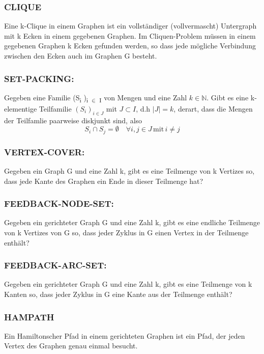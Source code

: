 \documentclass[11pt,twoside,landscape]{article}
\begin{document}
\begin{multicols}{3}
\subsubsection*{CLIQUE}
\label{sec:orgcf45af6}
Eine k-Clique in einem Graphen ist ein vollständiger (vollvermascht) Untergraph mit k Ecken in einem gegebenen Graphen. Im Cliquen-Problem müssen in einem gegebenen Graphen k Ecken gefunden werden, so dass jede mögliche Verbindung zwischen den Ecken auch im Graphen G besteht.
\subsubsection*{SET-PACKING:}
\label{sec:orgee5ab25}
Gegeben eine Familie (S\textsubscript{i} )\textsubscript{i \(\in\) I} von Mengen und eine Zahl \(k \in \mathbb{N}\). Gibt es eine k-elementige Teilfamilie \((S_i)_{i \in J}\) mit \(J \subset I\), d.h \(|J| = k\), derart, dass die Mengen der Teilfamlie paarweise diskjunkt sind, also
$$
S_i \cap S_j = \emptyset \quad \forall i, j \in J \, \text{mit} \, i \neq j
$$

\subsubsection*{VERTEX-COVER:}
\label{sec:org35b77bd}
Gegeben ein Graph G und eine Zahl k, gibt es eine Teilmenge von k Vertizes so, dass jede Kante des Graphen ein Ende in dieser Teilmenge hat?

\subsubsection*{FEEDBACK-NODE-SET:}
\label{sec:orgba948fa}
Gegeben ein gerichteter Graph G und eine Zahl k, gibt es eine endliche Teilmenge von k Vertizes von G so, dass jeder Zyklus in G einen Vertex in der Teilmenge enthält?

\subsubsection*{FEEDBACK-ARC-SET:}
\label{sec:orga2b11f8}
Gegeben ein gerichteter Graph G und eine Zahl k, gibt es eine Teilmenge von k Kanten so, dass jeder Zyklus in G eine Kante aus der Teilmenge enthält?

\subsubsection*{HAMPATH}
\label{sec:orgf8832ee}
Ein Hamiltonscher Pfad in einem gerichteten Graphen ist ein Pfad, der jeden Vertex des Graphen genau einmal besucht.

\end{multicols}
\end{document}
